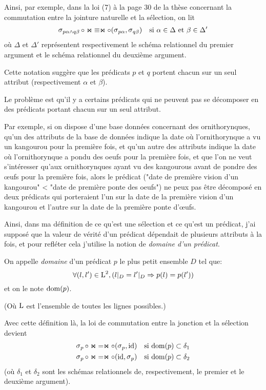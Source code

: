 Ainsi, par exemple, dans la loi (7) à la page 30 de la thèse
concernant la commutation entre la jointure naturelle et la
sélection,
on lit
\begin{align*}
\sel_{p\alpha \wedge q\beta} \circ \Join
& \equiv \Join \circ (\sel_{p\alpha}, \sel_{q\beta})
& \text{si $\alpha \in \Delta$ et $\beta \in \Delta'$}
\end{align*}
où $\Delta$ et $\Delta'$ représentent respectivement le schéma relationnel
du premier argument et le schéma relationnel du deuxième argument.

Cette notation suggère que les prédicats $p$ et $q$ portent
chacun sur un seul attribut (respectivement $\alpha$ et $\beta$).

Le problème est qu'il y a certains prédicats qui ne peuvent
pas se décomposer en des prédicats portant chacun sur un seul attribut.

Par exemple, si on dispose d'une base données concernant
des ornithorynques, qu'un des attributs de la base de données indique
la date où l'ornithorynque a vu un kangourou pour la première fois,
et qu'un autre des attributs indique la date où l'ornithorynque a pondu des oeufs
pour la première fois,
et que l'on ne veut s'intéresser qu'aux ornithorynques ayant vu des kangourous avant
de pondre des œufs pour la première fois, alors le prédicat
("date de première vision d'un kangourou" < "date de première ponte des oeufs")
ne peux pas être décomposé en deux prédicats qui porteraient l'un sur
la date de la première vision d'un kangourou et l'autre sur la date de la
première ponte d'œufs.

Ainsi, dans ma définition de ce qu'est une sélection et ce qu'est un prédicat,
j'ai supposé que la valeur de vérité d'un prédicat dépendait de plusieurs
attributs à la fois, et pour refléter cela j'utilise la notion de
\emph{domaine d'un prédicat}.

\begin{defi*}
On appelle \emph{domaine} d'un prédicat $p$ le plus petit
	ensemble $D$ tel que:
	$$
	\forall (l, l') \in \operatorname{L}^2, (l|_D = l'|_D \Rightarrow  p(l) = p(l'))
	$$
	et on le note $\operatorname{dom}(p)$.

	(Où $\operatorname{L}$ est l'ensemble de toutes les lignes possibles.)
\end{defi*}

Avec cette définition là, la loi de commutation entre la jonction
et la sélection devient
\begin{align*}
\selP \circ \Join
& = \Join \circ (\selP, \id)
& \text{si $\dom(p) \subset \delta_1$}
\label{seljoin1}\\
\selP \circ \Join
& = \Join \circ (\id, \selP)
& \text{si $\dom(p) \subset \delta_2$}
\end{align*}
(où $\delta_1$ et $\delta_2$ sont les schémas relationnels de, respectivement,
le premier et le deuxième argument).

